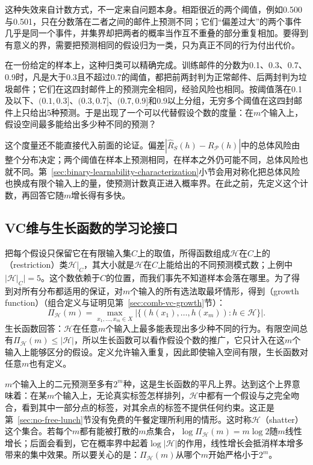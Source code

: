 这种失效来自计数方式，不一定来自问题本身。相距很近的两个阈值，例如0.500与0.501，只在分数落在二者之间的邮件上预测不同；它们“偏差过大”的两个事件几乎是同一个事件，并集界却把两者的概率当作互不重叠的部分重复相加。要得到有意义的界，需要把预测相同的假设归为一类，只为真正不同的行为付出代价。

在一份给定的样本上，这种归类可以精确完成。训练邮件的分数为0.1、0.3、0.7、0.9时，凡是大于0.3且不超过0.7的阈值，都把前两封判为正常邮件、后两封判为垃圾邮件；它们在这四封邮件上的预测完全相同，经验风险也相同。按阈值落在0.1及以下、$(0.1,0.3]$、$(0.3,0.7]$、$(0.7,0.9]$和0.9以上分组，无穷多个阈值在这四封邮件上只给出5种预测。于是出现了一个可以代替假设个数的度量：在$m$个输入上，假设空间最多能给出多少种不同的预测？

这个度量还不能直接代入前面的论证。偏差$|\hat R_S(h)-R_{\mathcal P}(h)|$中的总体风险由整个分布决定；两个阈值在样本上预测相同，在样本之外仍可能不同，总体风险也就不同。第~\ref{sec:binary-learnability-characterization}小节会用对称化把总体风险也换成有限个输入上的量，使预测计数真正进入概率界。在此之前，先定义这个计数，再回答它随$m$增长得有多快。

\subsection{VC维与生长函数的学习论接口}
\label{sec:binary-shattering-vc}

把每个假设只保留它在有限输入集$C$上的取值，所得函数组成$\mathcal H$在$C$上的（restriction）类$\mathcal H|_C$，其大小就是$\mathcal H$在$C$上能给出的不同预测模式数；上例中$|\mathcal H|_C|=5$。这个数依赖于$C$的位置，而我们事先不知道样本会落在哪里。为了得到对所有分布都适用的保证，对$m$个输入的所有选法取最坏情形，得到（growth function）（组合定义与证明见第~\ref{sec:comb-vc-growth}节）：
\begin{equation}
 \Pi_{\mathcal H}(m)
 =\max_{x_1,\ldots,x_m\in X}
   \left|\{(h(x_1),\ldots,h(x_m)):h\in\mathcal H\}\right|.
 \label{eq:learning-growth-function}
\end{equation}
生长函数回答：$\mathcal H$在任意$m$个输入上最多能表现出多少种不同的行为。有限空间总有$\Pi_{\mathcal H}(m)\leq|\mathcal H|$，所以生长函数可以看作假设个数的推广，它只计入在这$m$个输入上能够区分的假设。定义允许输入重复，因此即使输入空间有限，生长函数对任意$m$也有定义。

$m$个输入上的二元预测至多有$2^m$种，这是生长函数的平凡上界。达到这个上界意味着：在某$m$个输入上，无论真实标签怎样排列，$\mathcal H$中都有一个假设与之完全吻合，看到其中一部分点的标签，对其余点的标签不提供任何约束。这正是第~\ref{sec:no-free-lunch}节没有免费的午餐定理所利用的情形。这时称$\mathcal H$（shatter）这个集合。若每个$m$都有能被打散的$m$点集合，$\log\Pi_{\mathcal H}(m)=m\log2$随$m$线性增长；后面会看到，它在概率界中起着$\log|\mathcal H|$的作用，线性增长会抵消样本增多带来的集中效果。所以要关心的是：$\Pi_{\mathcal H}(m)$从哪个$m$开始严格小于$2^m$。

